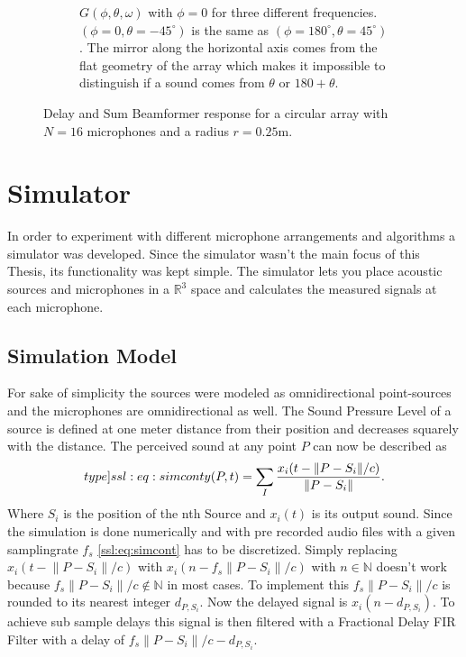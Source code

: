 \begin{figure}[h]
\begin{subfigure}[t]{0.45\textwidth}
		\caption{\(G(\phi, \theta, \omega)\) with $\phi = 0$ for three different frequencies. 
		$(\phi= 0, \theta = -45^\circ)$ is the same as $(\phi= 180^\circ, \theta = 45^\circ)$.
		The mirror along the horizontal axis comes from the flat geometry of the array which makes
		it impossible to distinguish if a sound comes from $\theta$ or $180 + \theta$.} 
		\label{ssl:fig:CircBmTheta}
	\end{subfigure}
	\caption{Delay and Sum Beamformer response for a circular array with $N=16$ microphones 
	and a radius $r = 0.25$m. }
	\label{ssl:fig:CircBmResponse}
\end{figure}

\newpage
\section{Simulator}
In order to experiment with different microphone arrangements and algorithms a simulator was developed.
Since the simulator wasn't the main focus of this Thesis, its functionality was kept simple.
The simulator lets you place acoustic sources and microphones in a $\mathbb{R}^3$ space and calculates
the measured signals at each microphone.

\subsection{Simulation Model}
For sake of simplicity the sources were modeled as omnidirectional point-sources and the
microphones are omnidirectional as well.
The Sound Pressure Level of a source is defined at one meter distance from their position and decreases
squarely with the distance.
The perceived sound at any point $P$ can now be described as
\begin{equation}
	\label[type]{ssl:eq:simcont}
	y(P, t) = \sum_{I} \frac{x_i(t - \lVert P - S_i\rVert/c)}{\lVert P - S_i\rVert}.
\end{equation}
Where $S_i$ is the position of the nth Source and $x_i(t)$ is its output sound.
Since the simulation is done numerically and with pre recorded audio files with a given
samplingrate $f_s$ \eqref{ssl:eq:simcont} has to be discretized.
Simply replacing $x_i(t - \lVert P - S_i\rVert/c)$ with
$x_i(n - f_s \lVert P - S_i\rVert/c)$ with
$n \in \mathbb{N}$ doesn't work because
$f_s \lVert P - S_i\rVert/c \not \in \mathbb{N}$ in most cases.
To implement this $f_s \lVert P - S_i\rVert/c$ is rounded to
its nearest integer $d_{P,S_i}$.
Now the delayed signal is $x_i(n - d_{P,S_i})$.
To achieve sub sample delays this signal is then filtered
with a Fractional Delay FIR Filter with a delay of
$f_s \lVert P - S_i\rVert/c - d_{P,S_i}$.


